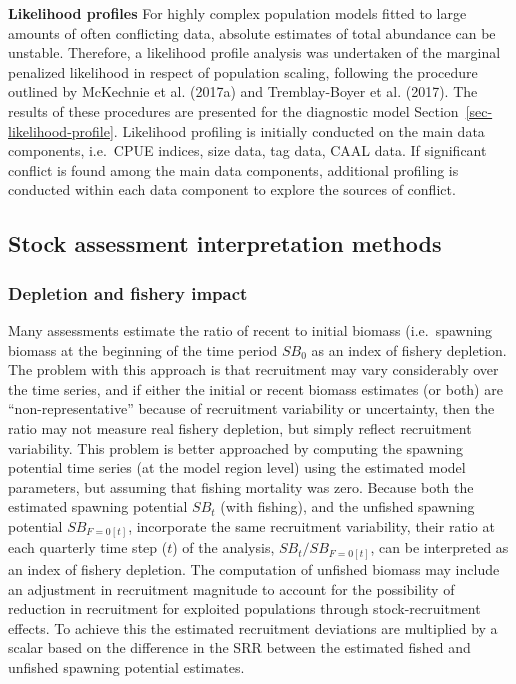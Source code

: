 \documentclass[
  english,
  a4paper,
  a4paper,
  11pt]{SCreport}
\begin{document}
\textbf{Likelihood profiles} For highly complex population models fitted
to large amounts of often conflicting data, absolute estimates of total
abundance can be unstable. Therefore, a likelihood profile analysis was
undertaken of the marginal penalized likelihood in respect of population
scaling, following the procedure outlined by McKechnie et al. (2017a)
and Tremblay-Boyer et al. (2017). The results of these procedures are
presented for the diagnostic model Section~\ref{sec-likelihood-profile}.
Likelihood profiling is initially conducted on the main data components,
i.e.~CPUE indices, size data, tag data, CAAL data. If significant
conflict is found among the main data components, additional profiling
is conducted within each data component to explore the sources of
conflict.

\subsection{Stock assessment interpretation
methods}\label{sec-stock-assessment-interp}

\subsubsection{Depletion and fishery
impact}\label{sec-methods-fishery-impacts}

Many assessments estimate the ratio of recent to initial biomass
(i.e.~spawning biomass at the beginning of the time period \(SB_{0}\) as
an index of fishery depletion. The problem with this approach is that
recruitment may vary considerably over the time series, and if either
the initial or recent biomass estimates (or both) are
``non-representative'' because of recruitment variability or
uncertainty, then the ratio may not measure real fishery depletion, but
simply reflect recruitment variability. This problem is better
approached by computing the spawning potential time series (at the model
region level) using the estimated model parameters, but assuming that
fishing mortality was zero. Because both the estimated spawning
potential \(SB_t\) (with fishing), and the unfished spawning potential
\(SB_{F=0[t]}\), incorporate the same recruitment variability, their
ratio at each quarterly time step (\(t\)) of the analysis,
\(SB_t/SB_{F=0[t]}\), can be interpreted as an index of fishery
depletion. The computation of unfished biomass may include an adjustment
in recruitment magnitude to account for the possibility of reduction in
recruitment for exploited populations through stock-recruitment effects.
To achieve this the estimated recruitment deviations are multiplied by a
scalar based on the difference in the SRR between the estimated fished
and unfished spawning potential estimates.
\end{document}
